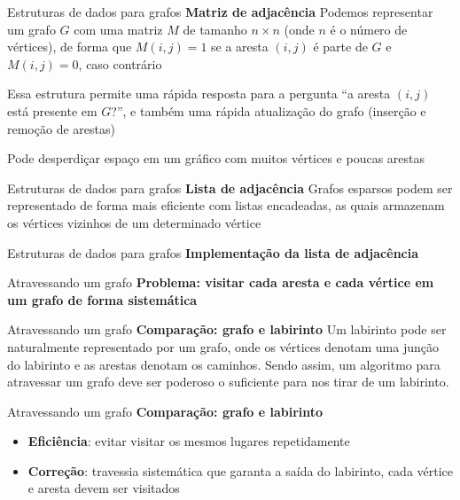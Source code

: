 \documentclass[10pt]{beamer}
\begin{document}
\begin{frame}{Estruturas de dados para grafos}
  \huge
  \textbf{Matriz de adjacência}
  \vfill
  \large
  Podemos representar um grafo $G$ com uma matriz $M$ de tamanho $n \times n$ (onde $n$ é o número de vértices), de forma que $M(i, j) = 1$ se a aresta $(i, j)$ é parte de $G$ e $M(i, j) = 0$, caso contrário

  Essa estrutura permite uma rápida resposta para a pergunta ``a aresta $(i, j)$ está presente em $G$?'', e também uma rápida atualização do grafo (inserção e remoção de arestas)

  Pode desperdiçar espaço em um gráfico com muitos vértices e poucas arestas
\end{frame}

\begin{frame}{Estruturas de dados para grafos}
  \huge
  \textbf{Lista de adjacência}
  \vfill
  \large
  Grafos esparsos podem ser representado de forma mais eficiente com listas encadeadas, as quais armazenam os vértices vizinhos de um determinado vértice
\end{frame}

\begin{frame}{Estruturas de dados para grafos}
  \huge
  \textbf{Implementação da lista de adjacência}
\end{frame}

\begin{frame}{Atravessando um grafo}
  \huge
  \textbf{Problema: visitar cada aresta e cada vértice em um grafo de forma sistemática}
\end{frame}

\begin{frame}{Atravessando um grafo}
  \huge
  \textbf{Comparação: grafo e labirinto}
  \vfill
  \large
  Um labirinto pode ser naturalmente representado por um grafo, onde os vértices denotam uma junção do labirinto e as arestas denotam os caminhos. Sendo assim, um algoritmo para atravessar um grafo deve ser poderoso o suficiente para nos tirar de um labirinto.
\end{frame}

\begin{frame}{Atravessando um grafo}
  \huge
  \textbf{Comparação: grafo e labirinto}
  \vfill
  \Large
  \begin{itemize}
    \item \textbf{Eficiência}: evitar visitar os mesmos lugares repetidamente
    \item \textbf{Correção}: travessia sistemática que garanta a saída do labirinto, cada vértice e aresta devem ser visitados
  \end{itemize}
\end{frame}
\end{document}
